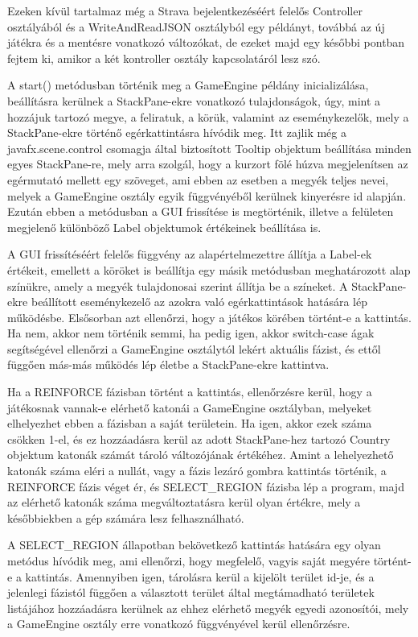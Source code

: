 Ezeken kívül tartalmaz még a Strava bejelentkezéséért felelős Controller osztályából és a WriteAndReadJSON osztályból egy példányt, továbbá az új játékra és a mentésre vonatkozó változókat, de ezeket majd egy későbbi pontban fejtem ki, amikor a két kontroller osztály kapcsolatáról lesz szó. 

A start() metódusban történik meg a GameEngine példány inicializálása, beállításra kerülnek a StackPane-ekre vonatkozó tulajdonságok, úgy, mint a hozzájuk tartozó megye, a feliratuk, a körük, valamint az eseménykezelők, mely a StackPane-ekre történő egérkattintásra hívódik meg. Itt zajlik még a javafx.scene.control csomagja által biztosított Tooltip objektum beállítása minden egyes StackPane-re, mely arra szolgál, hogy a kurzort fölé húzva megjelenítsen az egérmutató mellett egy szöveget, ami ebben az esetben a megyék teljes nevei, melyek a GameEngine osztály egyik függvényéből kerülnek kinyerésre id alapján. Ezután ebben a metódusban a GUI frissítése is megtörténik, illetve a felületen megjelenő különböző Label objektumok értékeinek beállítása is. 

A GUI frissítéséért felelős függvény az alapértelmezettre állítja a Label-ek értékeit, emellett a köröket is beállítja egy másik metódusban meghatározott alap színükre, amely a megyék tulajdonosai szerint állítja be a színeket. A StackPane-ekre beállított eseménykezelő az azokra való egérkattintások hatására lép működésbe. Elsősorban azt ellenőrzi, hogy a játékos körében történt-e a kattintás. Ha nem, akkor nem történik semmi, ha pedig igen, akkor switch-case ágak segítségével ellenőrzi a GameEngine osztálytól lekért aktuális fázist, és ettől függően más-más működés lép életbe a StackPane-ekre kattintva. 

Ha a REINFORCE fázisban történt a kattintás, ellenőrzésre kerül, hogy a játékosnak vannak-e elérhető katonái a GameEngine osztályban, melyeket elhelyezhet ebben a fázisban a saját területein. Ha igen, akkor ezek száma csökken 1-el, és ez hozzáadásra kerül az adott StackPane-hez tartozó Country objektum katonák számát tároló változójának értékéhez. Amint a lehelyezhető katonák száma eléri a nullát, vagy a fázis lezáró gombra kattintás történik, a REINFORCE fázis véget ér, és SELECT\_REGION fázisba lép a program, majd az elérhető katonák száma megváltoztatásra kerül olyan értékre, mely a későbbiekben a gép számára lesz felhasználható. 

A SELECT\_REGION állapotban bekövetkező kattintás hatására egy olyan metódus hívódik meg, ami ellenőrzi, hogy megfelelő, vagyis saját megyére történt-e a kattintás. Amennyiben igen, tárolásra kerül a kijelölt terület id-je, és a jelenlegi fázistól függően a választott terület által megtámadható területek listájához hozzáadásra kerülnek az ehhez elérhető megyék egyedi azonosítói, mely a GameEngine osztály erre vonatkozó függvényével kerül ellenőrzésre. 

